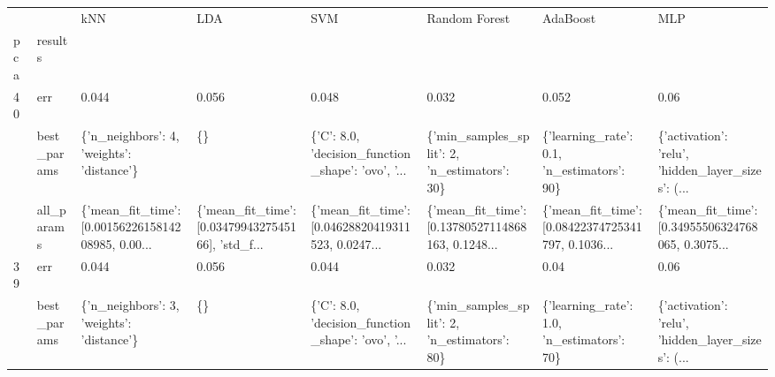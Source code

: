 \begin{tabular}{llllllll}
\toprule
   &            &                                                kNN &                                                LDA &                                                SVM &                                      Random Forest &                                           AdaBoost &                                                MLP \\
pca & results &                                                    &                                                    &                                                    &                                                    &                                                    &                                                    \\
\midrule
40 & err &                                              0.044 &                                              0.056 &                                              0.048 &                                              0.032 &                                              0.052 &                                               0.06 \\
   & best\_params &          \{'n\_neighbors': 4, 'weights': 'distance'\} &                                                 \{\} &  \{'C': 8.0, 'decision\_function\_shape': 'ovo', '... &       \{'min\_samples\_split': 2, 'n\_estimators': 30\} &         \{'learning\_rate': 0.1, 'n\_estimators': 90\} &  \{'activation': 'relu', 'hidden\_layer\_sizes': (... \\
   & all\_params &  \{'mean\_fit\_time': [0.0015622615814208985, 0.00... &  \{'mean\_fit\_time': [0.0347994327545166], 'std\_f... &  \{'mean\_fit\_time': [0.04628820419311523, 0.0247... &  \{'mean\_fit\_time': [0.13780527114868163, 0.1248... &  \{'mean\_fit\_time': [0.08422374725341797, 0.1036... &  \{'mean\_fit\_time': [0.34955506324768065, 0.3075... \\
39 & err &                                              0.044 &                                              0.056 &                                              0.044 &                                              0.032 &                                               0.04 &                                               0.06 \\
   & best\_params &          \{'n\_neighbors': 3, 'weights': 'distance'\} &                                                 \{\} &  \{'C': 8.0, 'decision\_function\_shape': 'ovo', '... &       \{'min\_samples\_split': 2, 'n\_estimators': 80\} &         \{'learning\_rate': 1.0, 'n\_estimators': 70\} &  \{'activation': 'relu', 'hidden\_layer\_sizes': (... \\

\end{tabular}
